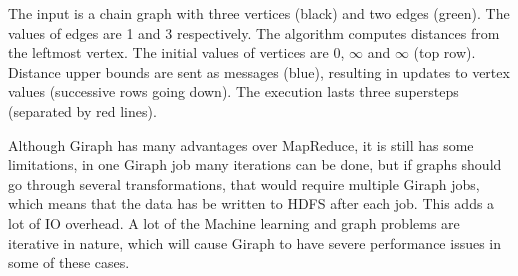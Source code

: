 \documentclass[english]{tktltiki}
\begin{document}
The input is a chain graph with three vertices (black) and two edges (green). The values of edges are 1 and 3 respectively. The algorithm computes distances from the leftmost vertex. The initial values of vertices are 0, $\infty$ and $\infty$ (top row). Distance upper bounds are sent as messages (blue), resulting in updates to vertex values (successive rows going down). The execution lasts three supersteps (separated by red lines).

Although Giraph has many advantages over MapReduce, it is still has some limitations, in one Giraph job many iterations can be done, but if graphs should go through several transformations, that would require multiple Giraph jobs, which means that the data has be written to HDFS after each job. This adds a lot of IO overhead. A lot of the Machine learning and graph problems are iterative in nature, which will cause Giraph to have severe performance issues in some of these cases.
\end{document}
